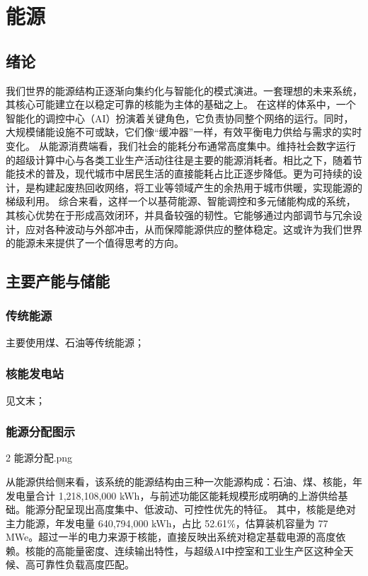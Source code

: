 ﻿\chapter{能源}\label{ux80fdux6e90}

\section{绪论}\label{ux7eeaux8bba}

我们世界的能源结构正逐渐向集约化与智能化的模式演进。一套理想的未来系统，其核心可能建立在以稳定可靠的核能为主体的基础之上。 在这样的体系中，一个智能化的调控中心（AI）扮演着关键角色，它负责协同整个网络的运行。同时，大规模储能设施不可或缺，它们像``缓冲器''一样，有效平衡电力供给与需求的实时变化。 从能源消费端看，我们社会的能耗分布通常高度集中。维持社会数字运行的超级计算中心与各类工业生产活动往往是主要的能源消耗者。相比之下，随着节能技术的普及，现代城市中居民生活的直接能耗占比正逐步降低。更为可持续的设计，是构建起废热回收网络，将工业等领域产生的余热用于城市供暖，实现能源的梯级利用。 综合来看，这样一个以基荷能源、智能调控和多元储能构成的系统，其核心优势在于形成高效闭环，并具备较强的韧性。它能够通过内部调节与冗余设计，应对各种波动与外部冲击，从而保障能源供应的整体稳定。这或许为我们世界的能源未来提供了一个值得思考的方向。

\section{主要产能与储能}\label{ux4e3bux8981ux4ea7ux80fdux4e0eux50a8ux80fd}

\subsection{传统能源}\label{ux4f20ux7edfux80fdux6e90}

主要使用煤、石油等传统能源；

\subsection{核能发电站}\label{ux6838ux80fdux53d1ux7535ux7ad9}

见文末；

\subsection{能源分配图示}\label{ux80fdux6e90ux5206ux914dux56feux793a}

2 能源分配.png

从能源供给侧来看，该系统的能源结构由三种一次能源构成：石油、煤、核能，年发电量合计 1,218,108,000 kWh，与前述功能区能耗规模形成明确的上游供给基础。能源分配呈现出高度集中、低波动、可控性优先的特征。 其中，核能是绝对主力能源，年发电量 640,794,000 kWh，占比 52.61\%，估算装机容量为 77 MWe。超过一半的电力来源于核能，直接反映出系统对稳定基载电源的高度依赖。核能的高能量密度、连续输出特性，与超级AI中控室和工业生产区这种全天候、高可靠性负载高度匹配。

